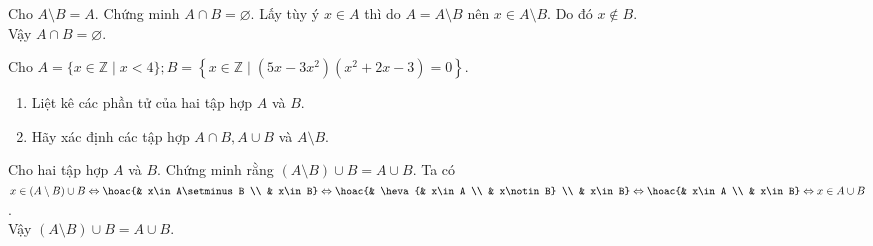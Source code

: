 \begin{bt}%
Cho $A\setminus B=A$. Chứng minh $A\cap B=\varnothing$.
\loigiai
{Lấy tùy ý $x\in A$ thì do $A=A\setminus B$ nên $x\in A\setminus B$. Do đó $x\notin B$.\\
Vậy $A\cap B=\varnothing$.
}
\end{bt}

\begin{bt}%
	Cho $A=\{x \in \mathbb{Z} \mid x<4\}; B=\left\{x \in \mathbb{Z} \mid\left(5x-3x^2\right)\left(x^2+2x-3\right)=0\right\}$.
	\begin{enumerate}
	\item Liệt kê các phần tử của hai tập hợp $A$ và $B$.
	\item Hãy xác định các tập hợp $A\cap B, A\cup B$ và $A\setminus B$.
	\end{enumerate}
\end{bt}

\begin{bt}%
Cho hai tập hợp $A$ và $B$. Chứng minh rằng $(A\setminus B)\cup B=A\cup B$.
\loigiai
{Ta có $x\in (A\setminus B)\cup B\Leftrightarrow\hoac{& x\in A\setminus B \\ & x\in B}\Leftrightarrow\hoac{& \heva{& x\in A \\ & x\notin B} \\ & x\in B}\Leftrightarrow\hoac{& x\in A \\ & x\in B}\Leftrightarrow x\in A\cup B$.\\
Vậy $(A\setminus B)\cup B=A\cup B$.
}
\end{bt}

